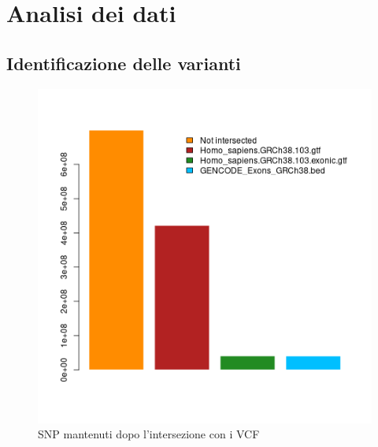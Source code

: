 \graphicspath{{chapters/04/media/}}
\chapter{Analisi dei dati}
\label{cha:analisi}

\section{Identificazione delle varianti}

 \begin{figure}[H]
   \centering
   \includegraphics[scale=1]{scelta_gtf.png}
   \caption{SNP mantenuti dopo l'intersezione con i VCF}
   \label{fig:}
 \end{figure}

